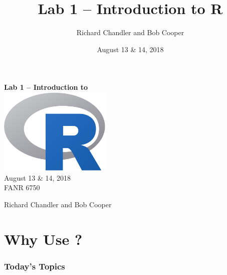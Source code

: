 \documentclass[color=usenames,dvipsnames]{beamer}\usepackage[]{graphicx}\usepackage[]{color}
\title{Lab 1 -- Introduction to {\bf R}}
\author{Richard Chandler and Bob Cooper}
\date{August 13 \& 14, 2018}
\begin{document}



\begin{frame}[plain]
  \LARGE
  {\centering
  {\huge \bf Lab 1 -- Introduction to \R} \\
  \vspace{0.9cm}
  \includegraphics[width=0.4\textwidth]{figs/Rlogo} \\
  \vspace{0.5cm}
  August 13 \& 14, 2018 \\
  FANR 6750 \par
  \vfill
  Richard Chandler and Bob Cooper \\
  }
\end{frame}




\section{Why Use \R?}


\begin{frame}[plain]
  \frametitle{Today's Topics}
  \Large
\end{frame}
\end{document}
